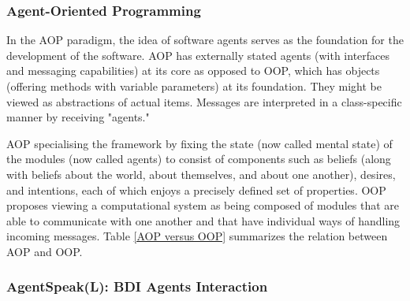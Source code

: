 \subsubsection{Agent-Oriented Programming}

In the \ac{AOP} paradigm, the idea of software agents serves as the foundation for the development of the software. \ac{AOP} has externally stated agents (with interfaces and messaging capabilities) at its core as opposed to \ac{OOP}, which has objects (offering methods with variable parameters) at its foundation. They might be viewed as abstractions of actual items. Messages are interpreted in a class-specific manner by receiving "agents."

\vspace{.5cm}

\ac{AOP} specialising the framework by fixing the state (now called mental state) of the modules (now called agents) to consist of components such as beliefs (along with beliefs about the world, about themselves, and about one another), desires, and intentions, each of which enjoys a precisely defined set of properties. \ac{OOP} proposes viewing a computational system as being composed of modules that are able to communicate with one another and that have individual ways of handling incoming messages.  Table \ref{AOP versus OOP} summarizes the relation between \ac{AOP} and \ac{OOP}.

\begin{table}[h]
\small
\centering
\caption{\ac{AOP} versus \ac{OOP}}
\label{AOP versus OOP}
\end{table}


\subsubsection{AgentSpeak(L): \ac{BDI} Agents Interaction}

